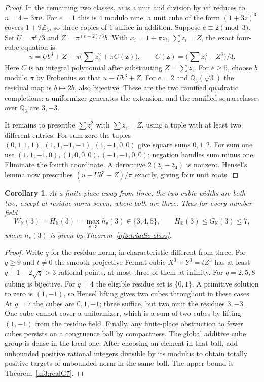 \documentclass[11pt,letterpaper]{article}
\newtheorem{corollary}[corollary]{Corollary}
\theoremstyle{definition}
\numberwithin{equation}{section}
\begin{document}
\begin{proof}
In the remaining two classes, $w$ is a unit and division by $w^3$
reduces to $n=4+3\pi u$. For $e=1$ this is $4$ modulo nine; a
unit cube of the form $(1+3z)^3$ covers $1+9\mathbb Z_3$,
so three copies of $1$ suffice in addition. Suppose
$e\equiv2\pmod3$. Set $U=\pi^e/3$ and
$Z=\pi^{(e-2)/3}b$. With $x_i=1+\pi z_i$, $\sum z_i=Z$, the
exact four-cube equation is
\[
  u=Ub^3+Z+\pi\bigl(\textstyle\sum z_i^2+\pi C(\mathbf z)\bigr),
 \qquad C(\mathbf z)=\bigl(\textstyle\sum z_i^3-Z^3\bigr)/3 .
\]
Here $C$ is an integral polynomial after substituting $Z=\sum z_i$.
For $e\ge5$, choose $b$ modulo $\pi$ by Frobenius so that
$u\equiv Ub^3+Z$. For $e=2$ and $\mathbb Q_3(\sqrt3)$ the residual
map is $b\mapsto 2b$, also bijective. These are the two ramified
quadratic completions: a uniformizer generates the extension, and
the ramified squareclasses over $\mathbb Q_3$ are $3,-3$.

It remains to prescribe $\sum\bar z_i^2$ with $\sum\bar z_i=\bar Z$,
using a tuple with at least two different entries. For sum zero the
tuples $(0,1,1,1),(1,1,-1,-1),(1,-1,0,0)$ give square sums
$0,1,2$. For sum one use $(1,1,-1,0),(1,0,0,0),(-1,-1,0,0)$;
negation handles sum minus one. Eliminate the fourth coordinate.
A derivative $2(\bar z_i-\bar z_4)$ is nonzero. Hensel's lemma
now prescribes $(u-Ub^3-Z)/\pi$ exactly, giving four unit roots.
\end{proof}
\begin{corollary}\label{nf3:all-local}
At a finite place away from three, the two cubic widths are both two,
except at residue norm seven, where both are three. Thus for every
number field
\[
 W_{\mathbb K}(3)=H_{\mathbb K}(3)
       =\max_{v\mid3}h_v(3)\in\{3,4,5\},
 \qquad H_{\mathbb K}(3)\le G_{\mathbb K}(3)\le7,
\]
where $h_v(3)$ is given by Theorem~\ref{nf3:triadic-class}.
\end{corollary}
\begin{proof}
Write $q$ for the residue norm, in characteristic different from
three. For $q\ge9$ and $t\ne0$ the smooth projective Fermat cubic
$X^3+Y^3=tZ^3$ has at least $q+1-2\sqrt q>3$ rational points,
at most three of them at infinity. For $q=2,5,8$ cubing is
bijective. For $q=4$ the eligible residue set is $\{0,1\}$.
A primitive solution to zero is $(1,-1)$, so Hensel lifting gives
two cubes throughout in these cases. At $q=7$ the cubes are
$0,1,-1$; three suffice, but two omit the residues $3,-3$.
One cube cannot cover a uniformizer, which is a sum of two cubes by
lifting $(1,-1)$ from the residue field. Finally, any finite-place
obstruction to fewer cubes persists on a congruence ball by compactness.
The global additive cube group is dense in the local one.
After choosing an element in that ball, add unbounded positive rational
integers divisible by its modulus to obtain totally positive targets
of unbounded norm in the same ball. The upper bound is
Theorem~\ref{nf3:realG7}.
\end{proof}
\end{document}
